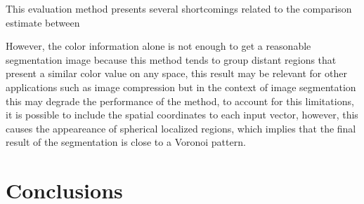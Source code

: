 \documentclass[10pt,twocolumn,letterpaper]{article}
\begin{document}
This evaluation method presents several shortcomings related to the comparison estimate between  

 However, the color information alone is not enough to get a reasonable segmentation image because this method tends to group distant regions that present a similar color value on any space, this result may be relevant for other applications such as image compression but in the context of image segmentation this may degrade the performance of the method, to account for this limitations, it is possible to include the spatial coordinates to each input vector, however, this causes the appeareance of spherical localized regions, which implies that the final result of the segmentation is close to a Voronoi pattern.   

\section{Conclusions}
 
\end{document}
